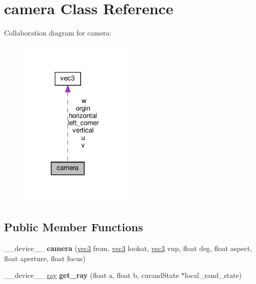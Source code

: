 \hypertarget{classcamera}{}\section{camera Class Reference}
\label{classcamera}


Collaboration diagram for camera\+:
\nopagebreak
\begin{figure}[H]
\begin{center}
\leavevmode
\includegraphics[width=151pt]{classcamera__coll__graph}
\end{center}
\end{figure}
\subsection*{Public Member Functions}
\begin{DoxyCompactItemize}
\item 
\mbox{\label{classcamera_a8089d4d23af412561230e5c0b5eb9f44}} 
\+\_\+\+\_\+device\+\_\+\+\_\+ {\bfseries camera} (\hyperlink{classvec3}{vec3} from, \hyperlink{classvec3}{vec3} lookat, \hyperlink{classvec3}{vec3} vup, float deg, float aspect, float aperture, float focus)
\item 
\mbox{\label{classcamera_a4bcc3d23d2589e7d95fdd1dd3b9d0287}} 
\+\_\+\+\_\+device\+\_\+\+\_\+ \hyperlink{classray}{ray} {\bfseries get\+\_\+ray} (float a, float b, curand\+State $\ast$local\+\_\+rand\+\_\+state)
\end{DoxyCompactItemize}
